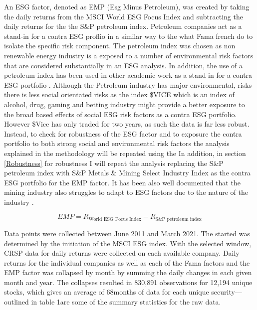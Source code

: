 \documentclass[12pt,oneside,reqno]{amsart}
\begin{document}
An ESG factor, denoted as EMP (Esg Minus Petroleum), was created by taking the daily returns from the MSCI World ESG Focus Index and subtracting the daily returns for the the  S\&P petroleum index. Petroleum companies act as a stand-in for a contra ESG proflio in a similar way to the what Fama french do to isolate the specific risk component. The  petroleum index was chosen as non renewable energy industry is a exposed to a number of environmental risk factors that are considered substantially in an ESG analysis. In addition, the use of a petroleum index has been used in other academic work as a stand in for a contra ESG portfolio \cite{Frynas2005TheFD}. Although the Petroleum industry has major environmental, risks there is less social orientated risks as the index \$VICE which is an index of alcohol, drug, gaming and betting industry might provide a better exposure to the broad based effects of social ESG risk factors as a contra ESG portfolio. However \$Vice has only traded for two years, as such the data is far less robust. Instead, to check for robustness of the ESG factor and to exposure the contra portfolio to both strong social and environmental risk factors the analysis explained in the methodology will be repeated using the  In addition, in section \ref{Robustness} for robustness I will repeat the analysis replacing the  S\&P petroleum index with S\&P Metals \& Mining Select Industry Index as the contra ESG portfolio for the EMP factor. It has been also well documented that the mining industry also struggles to adapt to ESG factors due to the nature of the industry \cite{Kapelus2002MiningCS}.

\begin{equation}
    \label{making_EMP}
    EMP = R_{\text{World ESG Focus Index}}- R_{\text{S\&P petroleum index}}
\end{equation}

 Data points were collected between June 2011 and March 2021. The started was determined by the initiation of the MSCI ESG index. With the selected window, CRSP data for daily returns were collected on each available company. Daily returns for the individual companies as well as each of the Fama factors and the EMP factor was collapsed by month by summing the daily changes in each given month and year. The collapses resulted in 830,891 observations for 12,194 unique stocks, which gives an average of 68months of data for each unique security—outlined in table 1are some of the summary statistics for the raw data.
\end{document}
